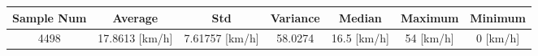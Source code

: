 \begin{longtable*}{|c|c|c|c|c|c|c|}\hline
{}
Sample Num&Average&Std&Variance&Median&Maximum&Minimum\\\hline\hline
{}4498&17.8613 [km/h]&7.61757 [km/h]&58.0274&16.5 [km/h]&54 [km/h]&0 [km/h]\\\hline
\end{longtable*}
